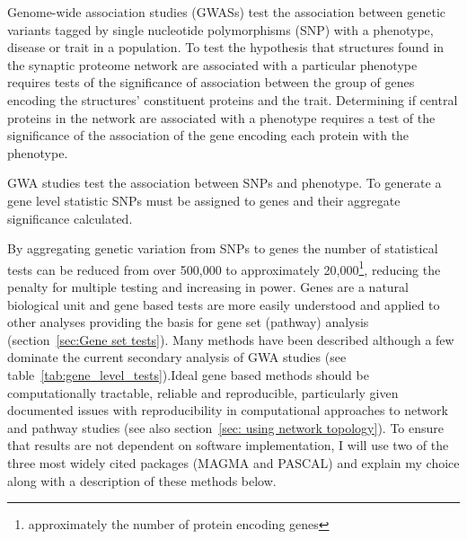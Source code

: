 Genome-wide association studies (GWASs) test the association between genetic variants tagged by single nucleotide polymorphisms (SNP) with a phenotype, disease or trait in a population\cite{visscher201710}. 
To test the hypothesis that structures found in the synaptic proteome network are associated with a particular phenotype requires tests of the significance of association between the group of genes encoding the structures' constituent proteins and the trait.
Determining if central proteins in the network are associated with a phenotype requires a test of the significance of the association of the gene encoding each protein with the phenotype.  

 GWA studies test the association between SNPs and phenotype. To generate a gene level statistic SNPs must be assigned to genes and their aggregate significance calculated\cite{petersen2013assessing}.

 By aggregating genetic variation from SNPs to genes the number of statistical tests can be reduced from over 500,000 to approximately 20,000\footnote{approximately the number of protein encoding genes}, reducing the penalty for multiple testing and increasing in power. Genes are a natural biological unit and gene based tests are more easily understood and applied to other analyses providing the basis for gene set (pathway) analysis (section~\ref{sec:Gene set tests}). Many methods have been described although a few dominate the current secondary analysis of GWA studies (see table~\ref{tab:gene_level_tests}).Ideal gene based methods should be computationally tractable, reliable and reproducible, particularly given documented issues with reproducibility in computational approaches to network and pathway studies  (see also section~\ref{sec: using network topology})\cite{mitra2013integrative}.
To ensure that results are not dependent on software implementation, I will use two of the three most widely cited packages (MAGMA\cite{de2015magma} and PASCAL\cite{lamparter2016fast}) and explain my choice along with a description of these methods below. 



